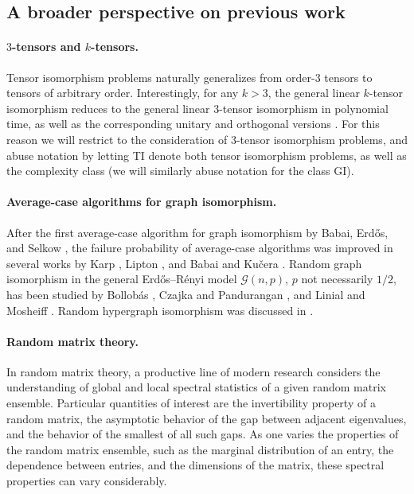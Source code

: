 \documentclass[11pt]{article}
\numberwithin{equation}{section}
\theoremstyle{remark}
\begin{document}
\subsection{A broader perspective on previous work}\label{subsec:previous}

\paragraph{$3$-tensors and $k$-tensors.} Tensor isomorphism problems naturally generalizes from order-$3$ tensors to tensors of arbitrary order. Interestingly, for any $k>3$, the general linear $k$-tensor isomorphism reduces to the general linear $3$-tensor isomorphism \cite{TI1} in polynomial time, as well as the corresponding unitary and orthogonal versions \cite{TI3}. For this reason we will restrict to the consideration of 3-tensor isomorphism problems, and abuse notation by letting TI denote both tensor isomorphism problems, as well as the complexity class (we will similarly abuse notation for the class GI).

\paragraph{Average-case algorithms for graph isomorphism.} After the first average-case algorithm for graph isomorphism by Babai, Erd\H{o}s, and Selkow \cite{BES80}, the failure probability of average-case algorithms was improved in several works by Karp \cite{karp1975fast}, Lipton \cite{lipton1978beacon}, and Babai and Ku\v{c}era \cite{DBLP:conf/focs/BabaiK79}. Random graph isomorphism in the general Erd\H{o}s--R\'enyi model $\mathcal{G}(n, p)$, $p$ not necessarily $1/2$, has been studied by Bollob\'as \cite{bollobas1982distinguishing}, Czajka and Pandurangan \cite{czajka2008improved}, and Linial and Mosheiff \cite{linial2017rigidity}. Random hypergraph isomorphism was discussed in \cite{chakraborti2021isomorphism}.

\paragraph{Random matrix theory.}
In random matrix theory, a productive line of modern research considers the understanding of global and local spectral statistics of a given random matrix ensemble. Particular quantities of interest are the invertibility property of a random matrix, the asymptotic behavior of the gap between adjacent eigenvalues, and the behavior of the smallest of all such gaps. As one varies the properties of the random matrix ensemble, such as the marginal distribution of an entry, the dependence between entries, and the dimensions of the matrix, these spectral properties can vary considerably.
\end{document}
